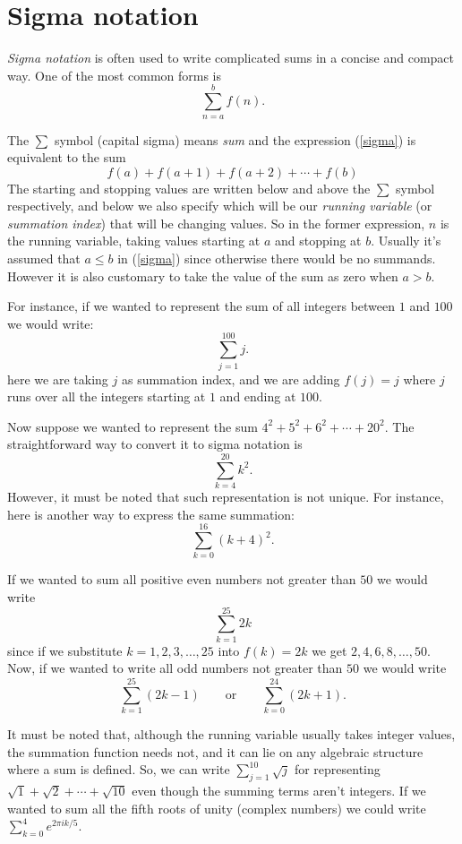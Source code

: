 \documentclass[12pt]{article}
\begin{document}
\section*{Sigma notation}
\emph{Sigma notation} is often used to write complicated sums in a concise and compact way. One of the most common forms is
\begin{equation}\label{sigma}
\sum_{n=a}^b f(n).
\end{equation}

The $\sum$ symbol (capital sigma) means \emph{sum} and the expression (\ref{sigma}) is equivalent to the sum
\[
f(a)+f(a+1) + f(a+2) + \cdots + f(b)
\]
The starting and stopping values are written below and above the $\sum$ symbol respectively, and below we also specify which will be our \emph{running variable} (or \emph{summation index}) that will be changing values. So in the former expression, $n$ is the running variable, taking values starting at $a$ and stopping at $b$.
Usually it's assumed that $a\leq b$ in (\ref{sigma}) since otherwise there would be no summands. However it is also customary to take the value of the sum as zero when $a>b$.

For instance, if we wanted to represent the sum of all integers between $1$ and $100$ we would write:
\[
\sum_{j=1}^{100} j.
\]
here we are taking $j$ as summation index, and we are adding $f(j)=j$ where $j$ runs over all the integers starting at $1$ and ending at $100$.

Now suppose we wanted to represent the sum $4^2 + 5^2 + 6^2 + \cdots + 20^2$. The straightforward way to convert it to sigma notation is 
\[\sum_{k=4}^{20} k^2.\]
However, it must be noted that such representation is not unique. For instance, here is another way to express the same summation:
\[\sum_{k=0}^{16} (k+4)^2.\]


If we wanted to sum all positive even numbers not greater than $50$ we would write
\[\sum_{k=1}^{25} 2k\]
since if we substitute $k=1,2,3,\ldots,25$ into $f(k)=2k$ we get $2,4,6,8,\ldots,50$.
Now, if we wanted to write all odd numbers not greater than $50$ we would write
\[\sum_{k=1}^{25} (2k-1)\qquad\mbox{or}\qquad\sum_{k=0}^{24}(2k+1).\]

It must be noted that, although the running variable usually takes integer values, the summation function needs not, and it can lie on any algebraic structure where a sum is defined. 
So, we can write $\sum_{j=1}^{10} \sqrt{j}$ for representing $\sqrt{1}+\sqrt{2}+\cdots+\sqrt{10}$ even though the summing terms aren't integers. If we wanted to sum all the fifth roots of unity (complex numbers) we could write $\sum_{k=0}^4 e^{2\pi ik/5}$.
\end{document}
